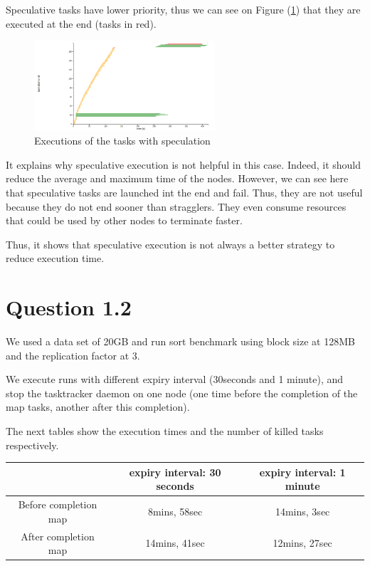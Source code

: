 \documentclass{article}
\begin{document}
Speculative tasks have lower priority, thus we can see on Figure (\ref{spec_prio}) that they are executed at the end (tasks in red).

\begin{figure}%
  \centering
  \includegraphics[width=0.6\textwidth]{spec.png}
  \caption{Executions of the tasks with speculation}
  \label{spec_prio}
\end{figure}


It explains why speculative execution is not helpful in this case. Indeed, it should reduce the average and maximum time of the nodes. However, we can see here that speculative tasks are launched int the end and fail. Thus, they are not useful because they do not end sooner than stragglers. They even consume resources that could be used by other nodes to terminate faster.

Thus, it shows that speculative execution is not always a better strategy to reduce execution time.

\section*{Question 1.2}

We used a data set of 20GB and run sort benchmark using block size at 128MB and the replication factor at 3.

We execute runs with different expiry interval (30seconds and 1 minute), and stop the tasktracker daemon on one node (one time before the completion of the map tasks, another after this completion).

The next tables show the execution times and the number of killed tasks respectively.

\begin{center}
\begin{tabular}{|c|c|c|}
\hline
\ & expiry interval: 30 seconds & expiry interval: 1 minute \\
\hline
Before completion map & 8mins, 58sec & 14mins, 3sec \\
\hline
After completion map & 14mins, 41sec & 12mins, 27sec\\
\hline
\end{tabular}
\end{center}
\end{document}
